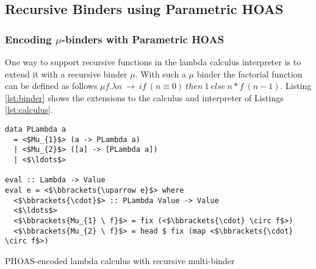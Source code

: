 \subsection{Recursive Binders using Parametric HOAS}\label{subsec:recursive}

\subsubsection{Encoding $\mu$-binders with Parametric HOAS}
\label{subsubsec:binder}

One way to support recursive functions in the lambda calculus interpreter is to extend it with a recursive binder $\mu$. With such a $\mu$ binder the factorial function can be defined as follows $\mu f. \lambda n \ \to \ if \ (n \equiv 0) \ then \ 1 \ else \ n * f \ (n - 1)$. Listing \ref{lst:binder} shows the extensions to the calculus and interpreter of Listings \ref{lst:calculus}.

\begin{listing}[H]
\begin{verbatim}
data PLambda a
  = <$Mu_{1}$> (a -> PLambda a)
  | <$Mu_{2}$> ([a] -> [PLambda a])
  | <$\ldots$>

eval :: Lambda -> Value
eval e = <$\bbrackets{\uparrow e}$> where
  <$\bbrackets{\cdot}$> :: PLambda Value -> Value
  <$\ldots$>
  <$\bbrackets{Mu_{1} \ f}$> = fix (<$\bbrackets{\cdot} \circ f$>)
  <$\bbrackets{Mu_{2} \ f}$> = head $ fix (map <$\bbrackets{\cdot} \circ f$>)

\end{verbatim}
\caption{PHOAS-encoded lambda calculus with recursive multi-binder}
\label{lst:binder}
\end{listing}
